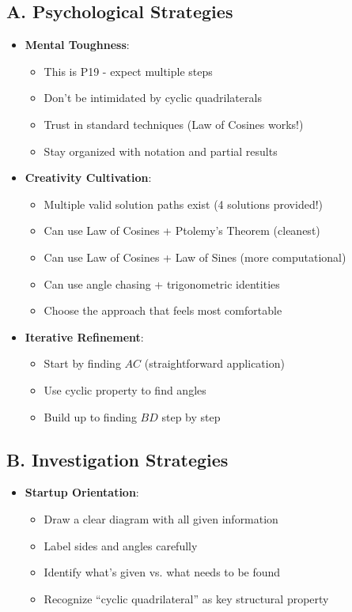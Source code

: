 \documentclass[11pt]{article}
\begin{document}
\begin{strategicbox}
\subsection*{A. Psychological Strategies}
\begin{itemize}[leftmargin=*]
    \item \textbf{Mental Toughness}: 
    \begin{itemize}
        \item This is P19 - expect multiple steps
        \item Don't be intimidated by cyclic quadrilaterals
        \item Trust in standard techniques (Law of Cosines works!)
        \item Stay organized with notation and partial results
    \end{itemize}
    
    \item \textbf{Creativity Cultivation}: 
    \begin{itemize}
        \item Multiple valid solution paths exist (4 solutions provided!)
        \item Can use Law of Cosines + Ptolemy's Theorem (cleanest)
        \item Can use Law of Cosines + Law of Sines (more computational)
        \item Can use angle chasing + trigonometric identities
        \item Choose the approach that feels most comfortable
    \end{itemize}
    
    \item \textbf{Iterative Refinement}: 
    \begin{itemize}
        \item Start by finding $AC$ (straightforward application)
        \item Use cyclic property to find angles
        \item Build up to finding $BD$ step by step
    \end{itemize}
\end{itemize}

\subsection*{B. Investigation Strategies}
\begin{itemize}[leftmargin=*]
    \item \textbf{Startup Orientation}: 
    \begin{itemize}
        \item Draw a clear diagram with all given information
        \item Label sides and angles carefully
        \item Identify what's given vs. what needs to be found
        \item Recognize ``cyclic quadrilateral'' as key structural property
    \end{itemize}
    

\end{itemize}
\end{strategicbox}
\end{document}
